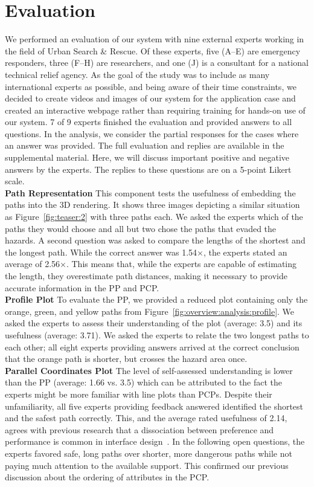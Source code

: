 \documentclass{egpubl}
\begin{document}
\section{Evaluation} \label{sec:evaluation}
We performed an evaluation of our system with nine external experts working in the field of Urban Search \& Rescue. Of these experts, five (A--E) are emergency responders, three (F--H) are researchers, and one (J) is a consultant for a national technical relief agency. As the goal of the study was to include as many international experts as possible, and being aware of their time constraints, we decided to create videos and images of our system for the application case and created an interactive webpage rather than requiring training for hands-on use of our system. 7 of 9 experts finished the evaluation and provided answers to all questions. In the analysis, we consider the partial responses for the cases where an answer was provided. The full evaluation and replies are available in the supplemental material. Here, we will discuss important positive and negative answers by the experts. The replies to these questions are on a 5-point Likert scale. \\
\textbf{Path Representation} This component tests the usefulness of embedding the paths into the 3D rendering. It shows three images depicting a similar situation as Figure~\ref{fig:teaser:2} with three paths each. We asked the experts which of the paths they would choose and all but two chose the paths that evaded the hazards. A second question was asked to compare the lengths of the shortest and the longest path. While the correct answer was 1.54$\times$, the experts stated an average of 2.56$\times$. This means that, while the experts are capable of estimating the length, they overestimate path distances, making it necessary to provide accurate information in the PP and PCP.\\
\textbf{Profile Plot} To evaluate the PP, we provided a reduced plot containing only the orange, green, and yellow paths from Figure~\ref{fig:overview:analysis:profile}. We asked the experts to assess their understanding of the plot (average: 3.5) and its usefulness (average: 3.71). We asked the experts to relate the two longest paths to each other; all eight experts providing answers arrived at the correct conclusion that the orange path is shorter, but crosses the hazard area once. \\
\textbf{Parallel Coordinates Plot} The level of self-assessed understanding is lower than the PP (average: 1.66 vs. 3.5) which can be attributed to the fact the experts might be more familiar with line plots than PCPs. Despite their unfamiliarity, all five experts providing feedback answered identified the shortest and the safest path correctly. This, and the average rated usefulness of 2.14,  agrees with previous research that a dissociation between preference and performance is common in interface design~\cite{andre1995users}. In the following open questions, the experts favored safe, long paths over shorter, more dangerous paths while not paying much attention to the available support. This confirmed our previous discussion about the ordering of attributes in the PCP.\\
\end{document}
